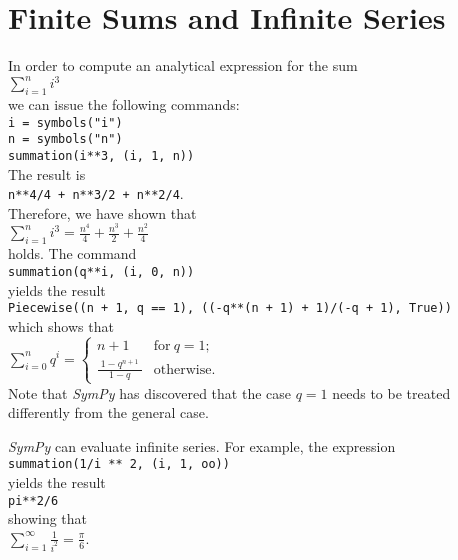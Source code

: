\documentclass{report}
\newcommand{\ds}{\displaystyle}
\begin{document}
\section{Finite Sums and Infinite Series}
In order to compute an analytical expression for the sum
\\[0.2cm]
\hspace*{1.3cm}
$\ds\sum\limits_{i=1}^n i^3$
\\[0.2cm]
we can issue the following commands:
\\[0.2cm]
\hspace*{1.3cm}
\texttt{i = symbols("i")} \\  
\hspace*{1.3cm}
\texttt{n = symbols("n")} \\  
\hspace*{1.3cm}
\texttt{summation(i**3, (i, 1, n))}
\\[0.2cm]
The result is
\\[0.2cm]
\hspace*{1.3cm}
\texttt{n**4/4 + n**3/2 + n**2/4}.
\\[0.2cm]
Therefore, we have shown that
\\[0.2cm]
\hspace*{1.3cm}
$\ds\sum\limits_{i=1}^n i^3 = \frac{n^{4}}{4} + \frac{n^{3}}{2} + \frac{n^{2}}{4}$
\\[0.2cm]
holds.  
The command
\\[0.2cm]
\hspace*{1.3cm}
\texttt{summation(q**i, (i, 0, n))}
\\[0.2cm]
yields the result
\\[0.2cm]
\hspace*{1.3cm}
\texttt{Piecewise((n + 1, q == 1), ((-q**(n + 1) + 1)/(-q + 1), True))}
\\[0.2cm]
which shows that
\\[0.2cm]
\hspace*{1.3cm}
$\ds\sum\limits_{i=0}^n q^i =
\begin{cases} 
  n + 1                    & \text{for}\: q = 1\text{;} \\[0.2cm]
  \frac{\;\ds 1 - q^{n+1}\;}{\ds 1 - q} & \text{otherwise.} 
\end{cases}
$
\\[0.2cm]
Note that \textsl{SymPy} has discovered that the case $q = 1$ needs to be treated differently from
the general case.

\textsl{SymPy} can evaluate infinite series.  For example, the expression
\\[0.2cm]
\hspace*{1.3cm}
\texttt{summation(1/i ** 2, (i, 1, oo))}
\\[0.2cm]
yields the result
\\[0.2cm]
\hspace*{1.3cm}
\texttt{pi**2/6}
\\[0.2cm]
showing that
\\[0.2cm]
\hspace*{1.3cm}
$\ds\sum\limits_{i=1}^\infty \frac{1}{i^2} = \frac{\pi}{6}$.
\end{document}
